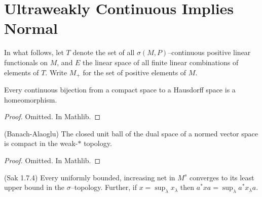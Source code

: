 \section{Ultraweakly Continuous Implies Normal}

In what follows, let $T$ denote the set of all $\sigma(M,P)$--continuous positive
linear functionals on $M$, and $E$ the linear space of all finite linear combinations
of elements of $T$. Write $M_{+}$ for the set of positive elements of $M$.

\begin{lemma}
  \label{lem:homeo_of_cts_bij_cpt_haus}
  \mathlibok
  Every continuous bijection from a compact space to a Hausdorff space is a 
  homeomorphism.
\end{lemma}

\begin{proof}
  \leanok
  Omitted. In Mathlib.
\end{proof}

\begin{theorem}
  \label{thm:Banach_Alaoglu}
  \mathlibok
  (Banach-Alaoglu) The closed unit ball of the dual space of a normed vector space is compact in the
  weak-$*$ topology.
\end{theorem}

\begin{proof}
  \leanok
  Omitted. In Mathlib.
\end{proof}

\begin{theorem}
  \label{lem:sigma_cont_of_normal_Sak_1_7_4} (Sak 1.7.4)
  \leanok
  Every uniformly bounded, increasing net in $M^{s}$ converges
  to its least upper bound in the $\sigma$--topology. Further, if
  $x=\sup_{\lambda}x_{\lambda}$ then $a^{*}xa=\sup_{\lambda}a^{*}x_{\lambda}a$.
\end{theorem}

